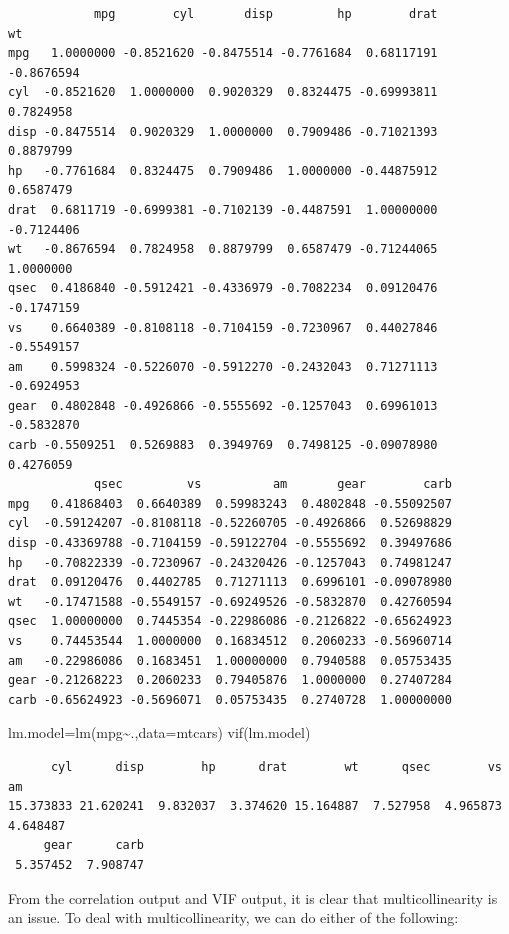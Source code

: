 \documentclass[
  letterpaper,
  DIV=11,
  numbers=noendperiod]{scrreprt}
\newenvironment{Shaded}{\begin{snugshade}}{\end{snugshade}}
\newcommand{\AttributeTok}[1]{\textcolor[rgb]{0.40,0.45,0.13}{#1}}
\newcommand{\FunctionTok}[1]{\textcolor[rgb]{0.28,0.35,0.67}{#1}}
\newcommand{\NormalTok}[1]{\textcolor[rgb]{0.00,0.23,0.31}{#1}}
\newcommand{\OtherTok}[1]{\textcolor[rgb]{0.00,0.23,0.31}{#1}}
\newcommand{\SpecialCharTok}[1]{\textcolor[rgb]{0.37,0.37,0.37}{#1}}
\begin{document}
\begin{verbatim}
            mpg        cyl       disp         hp        drat         wt
mpg   1.0000000 -0.8521620 -0.8475514 -0.7761684  0.68117191 -0.8676594
cyl  -0.8521620  1.0000000  0.9020329  0.8324475 -0.69993811  0.7824958
disp -0.8475514  0.9020329  1.0000000  0.7909486 -0.71021393  0.8879799
hp   -0.7761684  0.8324475  0.7909486  1.0000000 -0.44875912  0.6587479
drat  0.6811719 -0.6999381 -0.7102139 -0.4487591  1.00000000 -0.7124406
wt   -0.8676594  0.7824958  0.8879799  0.6587479 -0.71244065  1.0000000
qsec  0.4186840 -0.5912421 -0.4336979 -0.7082234  0.09120476 -0.1747159
vs    0.6640389 -0.8108118 -0.7104159 -0.7230967  0.44027846 -0.5549157
am    0.5998324 -0.5226070 -0.5912270 -0.2432043  0.71271113 -0.6924953
gear  0.4802848 -0.4926866 -0.5555692 -0.1257043  0.69961013 -0.5832870
carb -0.5509251  0.5269883  0.3949769  0.7498125 -0.09078980  0.4276059
            qsec         vs          am       gear        carb
mpg   0.41868403  0.6640389  0.59983243  0.4802848 -0.55092507
cyl  -0.59124207 -0.8108118 -0.52260705 -0.4926866  0.52698829
disp -0.43369788 -0.7104159 -0.59122704 -0.5555692  0.39497686
hp   -0.70822339 -0.7230967 -0.24320426 -0.1257043  0.74981247
drat  0.09120476  0.4402785  0.71271113  0.6996101 -0.09078980
wt   -0.17471588 -0.5549157 -0.69249526 -0.5832870  0.42760594
qsec  1.00000000  0.7445354 -0.22986086 -0.2126822 -0.65624923
vs    0.74453544  1.0000000  0.16834512  0.2060233 -0.56960714
am   -0.22986086  0.1683451  1.00000000  0.7940588  0.05753435
gear -0.21268223  0.2060233  0.79405876  1.0000000  0.27407284
carb -0.65624923 -0.5696071  0.05753435  0.2740728  1.00000000
\end{verbatim}

\begin{Shaded}
\begin{Highlighting}[]
\NormalTok{lm.model}\OtherTok{=}\FunctionTok{lm}\NormalTok{(mpg}\SpecialCharTok{\textasciitilde{}}\NormalTok{.,}\AttributeTok{data=}\NormalTok{mtcars)}
\FunctionTok{vif}\NormalTok{(lm.model)}
\end{Highlighting}
\end{Shaded}

\begin{verbatim}
      cyl      disp        hp      drat        wt      qsec        vs        am 
15.373833 21.620241  9.832037  3.374620 15.164887  7.527958  4.965873  4.648487 
     gear      carb 
 5.357452  7.908747 
\end{verbatim}

From the correlation output and VIF output, it is clear that
multicollinearity is an issue. To deal with multicollinearity, we can do
either of the following:
\end{document}
